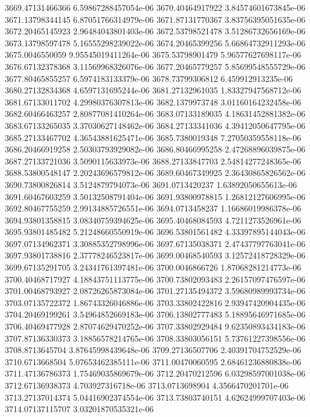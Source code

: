 {3669.47131466366 6.59867288457054e-06
3670.40464917922 3.84574601673845e-06
3671.13798344145 6.87051766314979e-06
3671.87131770367 3.83756395051635e-06
3672.20465145923 2.96484043801403e-06
3672.53798521478 3.51286732656169e-06
3673.13798597478 5.16555298239022e-06
3674.20465399256 5.66864732911293e-06
3675.0046550059 9.95545019411264e-06
3675.53798901479 5.96577627698117e-06
3676.67132378368 3.11569968326076e-06
3677.20465779257 5.85699548555729e-06
3677.80465855257 6.5974183133379e-06
3678.73799306812 6.459912913235e-06
3680.27132834368 4.6597131695244e-06
3681.27132961035 1.83327947568712e-06
3681.67133011702 4.29980376307813e-06
3682.1379973748 3.01160164232458e-06
3682.60466463257 2.80877081410264e-06
3683.07133189035 4.18631452881382e-06
3683.67133265035 3.37030627148462e-06
3684.27133341036 4.39412050647795e-06
3685.27133467702 4.36543881625471e-06
3685.7380019348 7.27050359558118e-06
3686.20466919258 2.50303793929082e-06
3686.80466995258 2.47268896039875e-06
3687.27133721036 3.5090115633973e-06
3688.27133847703 2.54814277248365e-06
3688.53800548147 2.20243696579812e-06
3689.60467349925 2.36430865826562e-06
3690.73800826814 3.5124879794073e-06
3691.0713420237 1.63892050655613e-06
3691.60467603259 3.50132508791404e-06
3691.93800978815 1.26812127606995e-06
3692.80467755259 2.99134885726551e-06
3694.0713458237 1.16686019986378e-06
3694.93801358815 3.08340759394625e-06
3695.40468084593 4.7211273526961e-06
3695.93801485482 5.21248660550919e-06
3696.53801561482 4.33397895144043e-06
3697.07134962371 3.30885352798996e-06
3697.67135038371 2.47437797763041e-06
3697.93801738816 2.37778246523817e-06
3699.00468540593 3.12572418728329e-06
3699.67135291705 3.24341761397481e-06
3700.0046866726 1.87068281214773e-06
3700.40468717927 4.18843751113775e-06
3700.73802093483 2.26157097476597e-06
3701.00468793927 2.08726265873084e-06
3701.27135494372 3.59680989993734e-06
3703.07135722372 1.86743326046886e-06
3703.33802422816 2.93947420904435e-06
3704.20469199261 3.54964852669183e-06
3706.13802777483 5.18895646971685e-06
3706.40469477928 2.87074629470252e-06
3707.33802929484 9.62350893434183e-06
3707.87136330373 3.18856578214765e-06
3708.33803056151 5.73761227398556e-06
3708.8713645704 3.87645998439648e-06
3709.27136507706 2.40391704752529e-06
3710.6713668504 5.07653462385111e-06
3711.00470060595 2.68461236880838e-06
3711.47136786373 1.75469035869679e-06
3712.20470212596 6.03298597001038e-06
3712.67136938373 4.703927316718e-06
3713.0713698904 4.3566470201701e-06
3713.27137014374 5.04416902374554e-06
3713.73803740151 4.62624999707403e-06
3714.07137115707 3.03201870535321e-06
}
